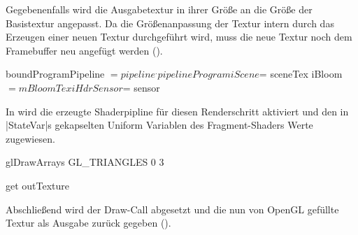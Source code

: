 Gegebenenfalls wird die Ausgabetextur in ihrer Größe an die Größe der Basistextur angepasst. Da die Größenanpassung der Textur intern durch das Erzeugen einer neuen Textur durchgeführt wird, muss die neue Textur noch dem Framebuffer neu angefügt werden ().

\begin{haskell}[label={lst:tonemap-pass-run-pipeline},caption={\texttt{ToneMapPass} Zuweisung an Uniform Variablen},nolol]
    boundProgramPipeline $= pipeline^.pipelineProgram

    iScene $= sceneTex
    iBloom $= mBloomTex
    iHdrSensor $= sensor
\end{haskell}

In  wird die erzeugte Shaderpipline für diesen Renderschritt aktiviert und den in |StateVar|s gekapselten Uniform Variablen des Fragment-Shaders Werte zugewiesen.

\begin{haskell}[label={lst:tonemap-pass-run-draw-and-out},caption={\texttt{ToneMapPass} Draw-Call und Textur ausgeben},nolol]
    glDrawArrays GL_TRIANGLES 0 3

    get outTexture
\end{haskell}

Abschließend wird der Draw-Call abgesetzt und die nun von OpenGL gefüllte Textur als Ausgabe zurück gegeben ().
